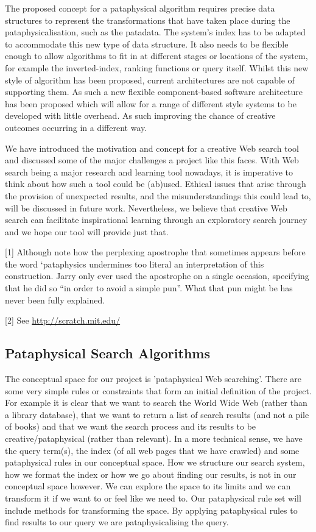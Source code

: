 The proposed concept for a pataphysical algorithm requires precise data structures to represent the transformations that have taken place during the pataphysicalisation, such as the patadata. The system’s index has to be adapted to accommodate this new type of data structure. It also needs to be flexible enough to allow algorithms to fit in at different stages or locations of the system, for example the inverted-index, ranking functions or query itself.
Whilst this new style of algorithm has been proposed, current architectures are not capable of supporting them. As such a new flexible component-based software architecture has been proposed which will allow for a range of different style systems to be developed with little overhead. As such improving the chance of creative outcomes occurring in a different way.

We have introduced the motivation and concept for a creative Web search tool and discussed some of the major challenges a project like this faces. With Web search being a major research and learning tool nowadays, it is imperative to think about how such a tool could be (ab)used. Ethical issues that arise through the provision of unexpected results, and the misunderstandings this could lead to, will be discussed in future work. Nevertheless, we believe that creative Web search can facilitate inspirational learning through an exploratory search journey and we hope our tool will provide just that.

[1] Although note how the perplexing apostrophe that sometimes appears before the word ‘pataphysics undermines too literal an interpretation of this construction. Jarry only ever used the apostrophe on a single occasion, specifying that he did so “in order to avoid a simple pun”. What that pun might be has never been fully explained.

[2] See \url{http://scratch.mit.edu/}

\subsection{Pataphysical Search Algorithms}

The conceptual space for our project is 'pataphysical Web searching'. There are some very simple rules or constraints that form an initial definition of the project. For example it is clear that we want to search the World Wide Web (rather than a library database), that we want to return a list of search results (and not a pile of books) and that we want the search process and its results to be creative/pataphysical (rather than relevant).  In a more technical sense, we have the query term(s), the index (of all web pages that we have crawled) and some pataphysical rules in our conceptual space. How we structure our search system, how we format the index or how we go about finding our results, is not in our conceptual space however. We can explore the space to its limits and we can transform it if we want to or feel like we need to. Our pataphysical rule set will include methods for transforming the space. By applying pataphysical rules to find results to our query we are pataphysicalising the query.

